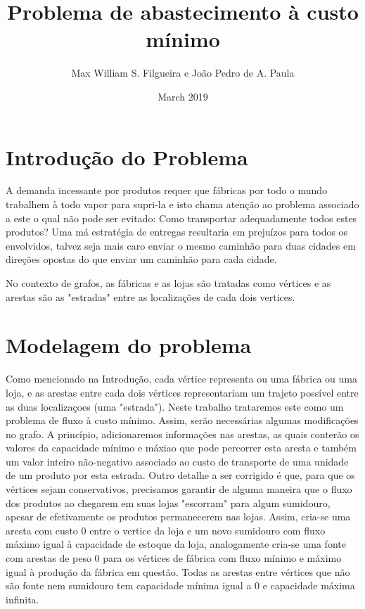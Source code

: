 \documentclass[12pt, a4]{article}
\title{Problema de abastecimento à custo mínimo}
\author{Max William S. Filgueira e João Pedro de A. Paula}
\date{March 2019}
\begin{document}
\maketitle

\tableofcontents

\newpage

\section{Introdução do Problema}

A demanda incessante por produtos requer que fábricas por todo o mundo trabalhem
à todo vapor para supri-la e isto chama atenção ao problema associado a este o
qual não pode ser evitado: Como transportar adequadamente todos estes produtos?
Uma má estratégia de entregas resultaria em prejuízos para todos os envolvidos,
talvez seja mais caro enviar o mesmo caminhão para duas cidades em direções
opostas do que enviar um caminhão para cada cidade.

No contexto de grafos, as fábricas e as lojas são tratadas como vértices e as
arestas são as "estradas" entre as localizações de cada dois vertices.

\section{Modelagem do problema}

Como mencionado na Introdução, cada vértice representa ou uma fábrica ou uma
loja, e as arestas entre cada dois vértices representariam um trajeto possível
entre as duas localizaçoes (uma "estrada"). Neste trabalho trataremos este como
um problema de fluxo à custo mínimo. Assim, serão necessárias algumas
modificações no grafo. A princípio, adicionaremos informações nas arestas, as
quais conterão os valores da capacidade mínimo e máxiao que pode percorrer esta
aresta e também um valor inteiro não-negativo associado ao custo de transporte
de uma unidade de um produto por esta estrada. Outro detalhe a ser corrigido é
que, para que os vértices sejam conservativos, precisamos garantir de alguma
maneira que o fluxo dos produtos ao chegarem em suas lojas "escorram" para algum
sumidouro, apesar de efetivamente os produtos permanecerem nas lojas. Assim,
cria-se uma aresta com custo 0 entre o vertice da loja e um novo sumidouro com
fluxo máximo igual à capacidade de estoque da loja, analogamente cria-se uma
fonte com arestas de peso 0 para os vértices de fábrica com fluxo mínimo e
máximo igual à produção da fábrica em questão. Todas as arestas entre vértices
que não são fonte nem sumidouro tem capacidade mínima igual a 0 e capacidade
máxima infinita.
\end{document}
